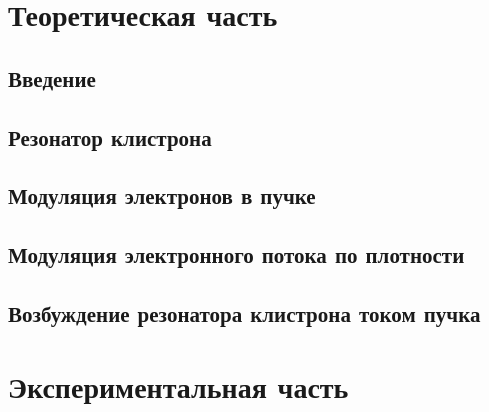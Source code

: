 
\usepackage{gensymb}
\usepackage{textcomp}
\usepackage{pythontex}


\def\labauthors{Карусевич А.А, Понур К.А.}
\def\labgroup{430}
\def\department{Кафедра электродинамики}
\def\labnumber{1}
\def\labtheme{Исследование отражательного клистрона}

\renewcommand{\Re}{\operatorname{Re}}
\renewcommand{\Im}{\operatorname{Im}}
\renewcommand{\phi}{\varphi}
\renewcommand{\hat}{\widehat}


\tableofcontents
\newpage

\section{Теоретическая часть}
\subsection{Введение}
\subsection{Резонатор клистрона}
\subsection{Модуляция электронов в пучке}
\subsection{Модуляция электронного потока по плотности}
\subsection{Возбуждение резонатора клистрона током пучка}

\section{Экспериментальная часть}

